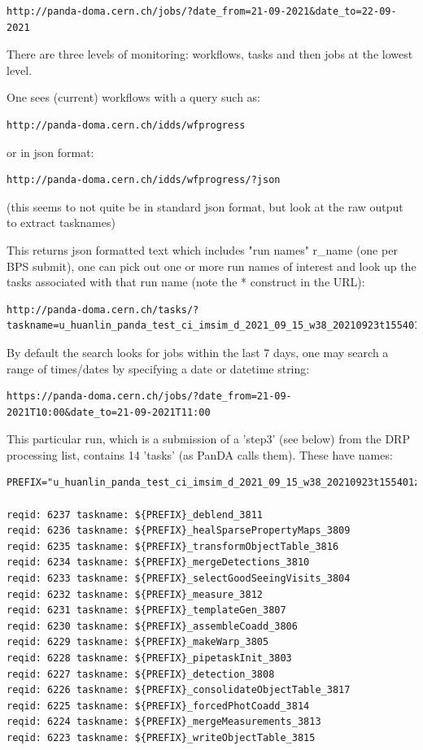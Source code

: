 \documentclass[DM,authoryear,toc]{lsstdoc}
\begin{document}
\begin{verbatim}
http://panda-doma.cern.ch/jobs/?date_from=21-09-2021&date_to=22-09-2021
\end{verbatim}

There are three levels of monitoring: workflows, tasks and then jobs at the lowest level.

One sees (current) workflows with a query such as:

\begin{verbatim}
http://panda-doma.cern.ch/idds/wfprogress
\end{verbatim}

or in json format:
\begin{verbatim}
http://panda-doma.cern.ch/idds/wfprogress/?json
\end{verbatim}

(this seems to not quite be in standard json format, but look at the raw output to extract tasknames)

This returns json formatted text which includes "run names" r\_name
(one per BPS submit), one can pick out one or more run names of interest and look up the tasks associated
with that run name (note the * construct in the URL):

\begin{verbatim}
http://panda-doma.cern.ch/tasks/?taskname=u_huanlin_panda_test_ci_imsim_d_2021_09_15_w38_20210923t155401z*&json
\end{verbatim}

By default the search looks for jobs within the last 7 days, one may search a range of times/dates
by specifying a date or datetime string:

\begin{verbatim}
https://panda-doma.cern.ch/jobs/?date_from=21-09-2021T10:00&date_to=21-09-2021T11:00
\end{verbatim}

This particular run, which is a submission of a 'step3' (see below) from the
DRP processing list, contains 14 'tasks' (as PanDA calls them).
These have names:

\begin{verbatim}
PREFIX="u_huanlin_panda_test_ci_imsim_d_2021_09_15_w38_20210923t155401z"

reqid: 6237 taskname: ${PREFIX}_deblend_3811
reqid: 6236 taskname: ${PREFIX}_healSparsePropertyMaps_3809
reqid: 6235 taskname: ${PREFIX}_transformObjectTable_3816
reqid: 6234 taskname: ${PREFIX}_mergeDetections_3810
reqid: 6233 taskname: ${PREFIX}_selectGoodSeeingVisits_3804
reqid: 6232 taskname: ${PREFIX}_measure_3812
reqid: 6231 taskname: ${PREFIX}_templateGen_3807
reqid: 6230 taskname: ${PREFIX}_assembleCoadd_3806
reqid: 6229 taskname: ${PREFIX}_makeWarp_3805
reqid: 6228 taskname: ${PREFIX}_pipetaskInit_3803
reqid: 6227 taskname: ${PREFIX}_detection_3808
reqid: 6226 taskname: ${PREFIX}_consolidateObjectTable_3817
reqid: 6225 taskname: ${PREFIX}_forcedPhotCoadd_3814
reqid: 6224 taskname: ${PREFIX}_mergeMeasurements_3813
reqid: 6223 taskname: ${PREFIX}_writeObjectTable_3815

\end{verbatim}
\end{document}
